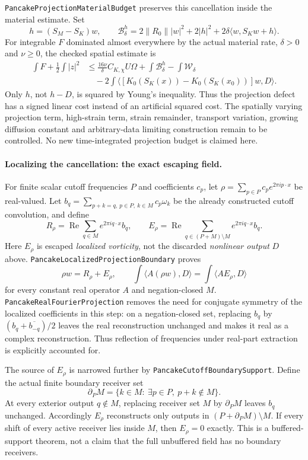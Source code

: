 \documentclass[11pt]{article}
\theoremstyle{definition}
\begin{document}
\texttt{PancakeProjectionMaterialBudget} preserves this cancellation
inside the material estimate. Set
\[
 h=(S_M-S_K)w,\qquad
 \mathcal B^h_\delta=2\|R_0\||w|^2+2|h|^2
                           +2\delta\langle w,S_Kw+h\rangle.
\]
For integrable $F$ dominated almost everywhere by the actual material
rate, $\delta>0$ and $\nu\ge0$, the checked spatial estimate is
\[
 \begin{aligned}
 \int F+\frac12\int|z|^2
 &\le\frac{16\nu}{\delta}C_{K,\chi}U\Omega
       +\int\mathcal B^h_\delta-\int\mathcal W_\delta\\
 &\quad-2\int\bigl\langle
       [K_0(S_K(x))-K_0(S_K(x_0))]w,D\bigr\rangle.
 \end{aligned}
\]
Only $h$, not $h-D$, is squared by Young's inequality. Thus the
projection defect has a signed linear cost instead of an artificial
squared cost. The spatially varying projection term, high-strain term,
strain remainder, transport variation, growing diffusion constant and
arbitrary-data limiting construction remain to be controlled. No new
time-integrated projection budget is claimed here.

\paragraph{Localizing the cancellation: the exact escaping field.}
For finite scalar cutoff frequencies $P$ and coefficients $c_p$, let
$\rho=\sum_{p\in P}c_pe^{2\pi i p\cdot x}$ be real-valued.
Let $b_q=\sum_{p+k=q,\ p\in P,\ k\in M}c_p\omega_k$ be the
already constructed cutoff convolution, and define
\[
 R_\rho=\operatorname{Re}\sum_{q\in M}e^{2\pi iq\cdot x}b_q,
 \qquad
 E_\rho=\operatorname{Re}\sum_{q\in(P+M)\setminus M}
                    e^{2\pi iq\cdot x}b_q.
\]
Here $E_\rho$ is escaped \emph{localized vorticity}, not the discarded
\emph{nonlinear output} $D$ above.
\texttt{PancakeLocalizedProjectionBoundary} proves
\[
 \rho w=R_\rho+E_\rho,\qquad
 \int\langle A(\rho w),D\rangle=\int\langle AE_\rho,D\rangle
\]
for every constant real operator $A$ and negation-closed $M$.
\texttt{PancakeRealFourierProjection} removes the need for conjugate
symmetry of the localized coefficients in this step: on a
negation-closed set, replacing $b_q$ by
$(b_q+\overline{b_{-q}})/2$ leaves the real reconstruction unchanged and
makes it real as a complex reconstruction. Thus reflection of frequencies
under real-part extraction is explicitly accounted for.

The source of $E_\rho$ is narrowed further by
\texttt{PancakeCutoffBoundarySupport}. Define the actual finite boundary
receiver set
\[
 \partial_P M=\{k\in M:\ \exists p\in P,\ p+k\notin M\}.
\]
At every exterior output $q\notin M$, replacing receiver set $M$ by
$\partial_PM$ leaves $b_q$ unchanged. Accordingly $E_\rho$ reconstructs
only outputs in $(P+\partial_PM)\setminus M$. If every shift of every
active receiver lies inside $M$, then $E_\rho=0$ exactly. This is a
buffered-support theorem, not a claim that the full unbuffered field
has no boundary receivers.
\end{document}
